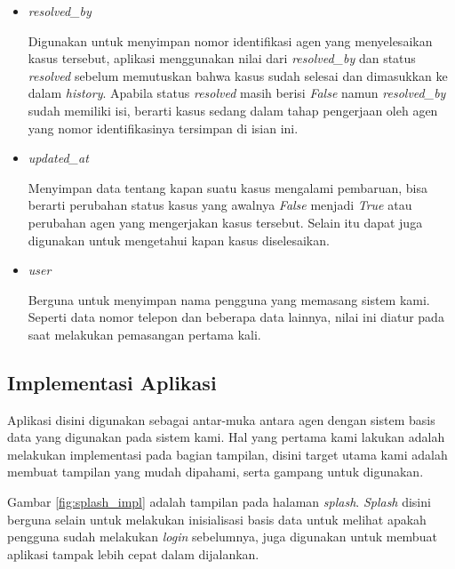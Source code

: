 \begin{itemize}
  \item \textit{resolved\_by}

        Digunakan untuk menyimpan nomor identifikasi agen yang menyelesaikan kasus tersebut, aplikasi menggunakan nilai dari \textit{resolved\_by} dan status \textit{resolved} sebelum memutuskan bahwa kasus sudah selesai dan dimasukkan ke dalam \textit{history}. Apabila status \textit{resolved} masih berisi \textit{False} namun \textit{resolved\_by} sudah memiliki isi, berarti kasus sedang dalam tahap pengerjaan oleh agen yang nomor identifikasinya tersimpan di isian ini.

  \item \textit{updated\_at}

        Menyimpan data tentang kapan suatu kasus mengalami pembaruan, bisa berarti perubahan status kasus yang awalnya \textit{False} menjadi \textit{True} atau perubahan agen yang mengerjakan kasus tersebut. Selain itu dapat juga digunakan untuk mengetahui kapan kasus diselesaikan.

  \item \textit{user}

        Berguna untuk menyimpan nama pengguna yang memasang sistem kami. Seperti data nomor telepon dan beberapa data lainnya, nilai ini diatur pada saat melakukan pemasangan pertama kali.

\end{itemize}

\subsection{Implementasi Aplikasi}

Aplikasi disini digunakan sebagai antar-muka antara agen dengan sistem basis data yang digunakan pada sistem kami. Hal yang pertama kami lakukan adalah melakukan implementasi pada bagian tampilan, disini target utama kami adalah membuat tampilan yang mudah dipahami, serta gampang untuk digunakan.

Gambar \ref{fig:splash_impl} adalah tampilan pada halaman \textit{splash}. \textit{Splash} disini berguna selain untuk melakukan inisialisasi basis data untuk melihat apakah pengguna sudah melakukan \textit{login} sebelumnya, juga digunakan untuk membuat aplikasi tampak lebih cepat dalam dijalankan.

